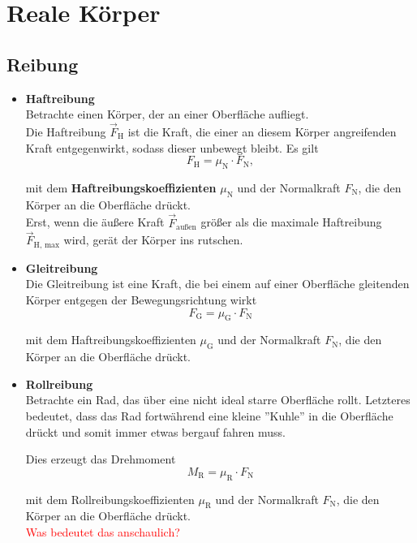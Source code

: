 \documentclass{article}
\begin{document}
\newpage


\section{Reale Körper}
\subsection{Reibung}
\begin{itemize}
	\item \textbf{Haftreibung}\\
	Betrachte einen Körper, der an einer Oberfläche aufliegt.\\
	Die Haftreibung $\vec{F}_\text{H}$ ist die Kraft, die einer an diesem Körper angreifenden Kraft entgegenwirkt, sodass dieser unbewegt bleibt. Es gilt
		\begin{equation}
			F_\text{H} = \mu_\text{N} \cdot F_\text{N},
		\end{equation}

	mit dem \textbf{Haftreibungskoeffizienten} $\mu_\text{N}$ und der Normalkraft $F_\text{N}$, die den Körper an die Oberfläche drückt.\\
	Erst, wenn die äußere Kraft $\vec{F}_\text{außen}$ größer als die maximale Haftreibung $\vec{F}_\text{H, max}$ wird, gerät der Körper ins rutschen.


	\item \textbf{Gleitreibung}\\
	Die Gleitreibung ist eine Kraft, die bei einem auf einer Oberfläche gleitenden Körper entgegen der Bewegungsrichtung wirkt
		\begin{equation}
			F_\text{G} = \mu_\text{G} \cdot F_\text{N}
		\end{equation}

	mit dem Haftreibungskoeffizienten $\mu_\text{G}$ und der Normalkraft $F_\text{N}$, die den Körper an die Oberfläche drückt.


	\item \textbf{Rollreibung}\\
	Betrachte ein Rad, das über eine nicht ideal starre Oberfläche rollt. Letzteres bedeutet, dass das Rad fortwährend eine kleine ''Kuhle'' in die Oberfläche drückt und somit immer etwas bergauf fahren muss. {\color{red} Dies erzeugt das Drehmoment
		\begin{equation}
			M_\text{R} = \mu_\text{R} \cdot F_\text{N}
		\end{equation}

	} mit dem Rollreibungskoeffizienten $\mu_\text{R}$ und der Normalkraft $F_\text{N}$, die den Körper an die Oberfläche drückt.\\
	\textcolor{red}{ Was bedeutet das anschaulich?}
\end{itemize}
\end{document}
